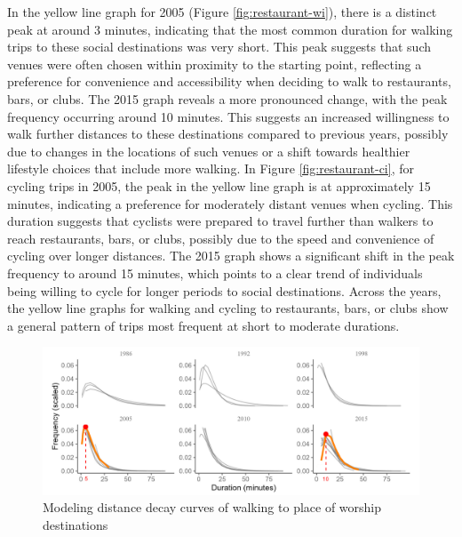 \documentclass[12pt,twoside]{reedthesis}
\begin{document}
In the yellow line graph for 2005 (Figure \ref{fig:restaurant-wi}), there is a distinct peak at around 3 minutes, indicating that the most common duration for walking trips to these social destinations was very short. This peak suggests that such venues were often chosen within proximity to the starting point, reflecting a preference for convenience and accessibility when deciding to walk to restaurants, bars, or clubs. The 2015 graph reveals a more pronounced change, with the peak frequency occurring around 10 minutes. This suggests an increased willingness to walk further distances to these destinations compared to previous years, possibly due to changes in the locations of such venues or a shift towards healthier lifestyle choices that include more walking. In Figure \ref{fig:restaurant-ci}, for cycling trips in 2005, the peak in the yellow line graph is at approximately 15 minutes, indicating a preference for moderately distant venues when cycling. This duration suggests that cyclists were prepared to travel further than walkers to reach restaurants, bars, or clubs, possibly due to the speed and convenience of cycling over longer distances. The 2015 graph shows a significant shift in the peak frequency to around 15 minutes, which points to a clear trend of individuals being willing to cycle for longer periods to social destinations. Across the years, the yellow line graphs for walking and cycling to restaurants, bars, or clubs show a general pattern of trips most frequent at short to moderate durations.

\newpage
\thispagestyle{empty}
\begin{landscape}
\begin{figure}

{\centering \includegraphics[width=0.9\linewidth]{place-wi} 

}

\caption{Modeling distance decay curves of walking to place of worship destinations}\label{fig:place-wi}
\end{figure}
\end{landscape}
\clearpage
\end{document}
